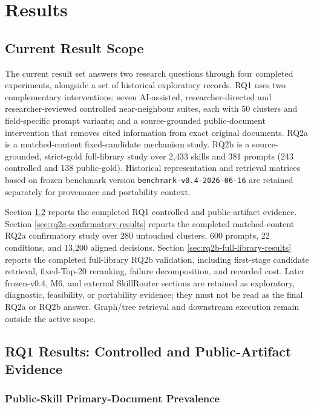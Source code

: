 \chapter{Results}

\section{Current Result Scope}

The current result set answers two research questions through four completed experiments, alongside a set of historical exploratory records. RQ1 uses two complementary interventions: seven AI-assisted, researcher-directed and researcher-reviewed controlled near-neighbour suites, each with 50 clusters and field-specific prompt variants; and a source-grounded public-document intervention that removes cited information from exact original documents. RQ2a is a matched-content fixed-candidate mechanism study. RQ2b is a source-grounded, strict-gold full-library study over 2,433 skills and 381 prompts (243 controlled and 138 public-gold). Historical representation and retrieval matrices based on frozen benchmark version \texttt{benchmark-v0.4-2026-06-16} are retained separately for provenance and portability context.

Section \ref{sec:rq1-results-field-isolation} reports the completed RQ1 controlled and public-artifact evidence. Section \ref{sec:rq2a-confirmatory-results} reports the completed matched-content RQ2a confirmatory study over 280 untouched clusters, 600 prompts, 22 conditions, and 13,200 aligned decisions. Section \ref{sec:rq2b-full-library-results} reports the completed full-library RQ2b validation, including first-stage candidate retrieval, fixed-Top-20 reranking, failure decomposition, and recorded cost. Later frozen-v0.4, M6, and external SkillRouter sections are retained as exploratory, diagnostic, feasibility, or portability evidence; they must not be read as the final RQ2a or RQ2b answer. Graph/tree retrieval and downstream execution remain outside the active scope.

\section{RQ1 Results: Controlled and Public-Artifact Evidence}
\label{sec:rq1-results-field-isolation}

\subsection{Public-Skill Primary-Document Prevalence}

